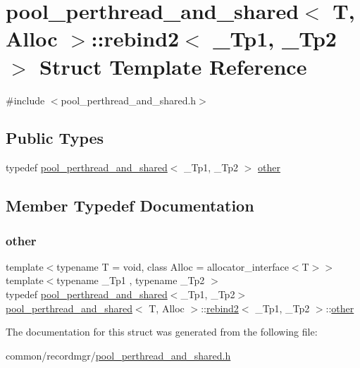 \hypertarget{structpool__perthread__and__shared_1_1rebind2}{}\section{pool\+\_\+perthread\+\_\+and\+\_\+shared$<$ T, Alloc $>$\+:\+:rebind2$<$ \+\_\+\+Tp1, \+\_\+\+Tp2 $>$ Struct Template Reference}
\label{structpool__perthread__and__shared_1_1rebind2}


{\ttfamily \#include $<$pool\+\_\+perthread\+\_\+and\+\_\+shared.\+h$>$}

\subsection*{Public Types}
\begin{DoxyCompactItemize}
\item 
typedef \hyperlink{classpool__perthread__and__shared}{pool\+\_\+perthread\+\_\+and\+\_\+shared}$<$ \+\_\+\+Tp1, \+\_\+\+Tp2 $>$ \hyperlink{structpool__perthread__and__shared_1_1rebind2_acb5bb62ee6a0868b8bbfe494adf66e96}{other}
\end{DoxyCompactItemize}


\subsection{Member Typedef Documentation}
\mbox{\label{structpool__perthread__and__shared_1_1rebind2_acb5bb62ee6a0868b8bbfe494adf66e96}} 
\subsubsection{\texorpdfstring{other}{other}}
{\footnotesize\ttfamily template$<$typename T  = void, class Alloc  = allocator\+\_\+interface$<$\+T$>$$>$ \\
template$<$typename \+\_\+\+Tp1 , typename \+\_\+\+Tp2 $>$ \\
typedef \hyperlink{classpool__perthread__and__shared}{pool\+\_\+perthread\+\_\+and\+\_\+shared}$<$\+\_\+\+Tp1, \+\_\+\+Tp2$>$ \hyperlink{classpool__perthread__and__shared}{pool\+\_\+perthread\+\_\+and\+\_\+shared}$<$ T, Alloc $>$\+::\hyperlink{structpool__perthread__and__shared_1_1rebind2}{rebind2}$<$ \+\_\+\+Tp1, \+\_\+\+Tp2 $>$\+::\hyperlink{structpool__perthread__and__shared_1_1rebind2_acb5bb62ee6a0868b8bbfe494adf66e96}{other}}



The documentation for this struct was generated from the following file\+:\begin{DoxyCompactItemize}
\item 
common/recordmgr/\hyperlink{pool__perthread__and__shared_8h}{pool\+\_\+perthread\+\_\+and\+\_\+shared.\+h}\end{DoxyCompactItemize}
